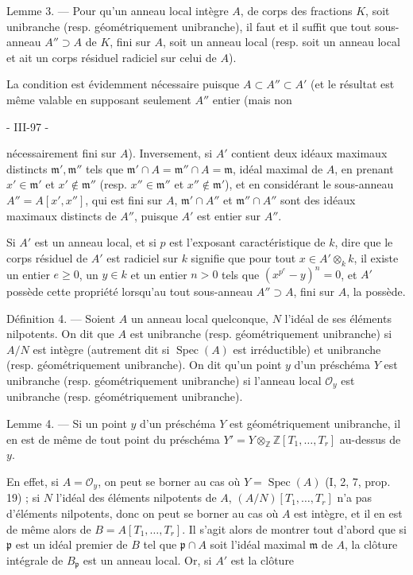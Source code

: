 Lemme 3. — Pour qu'un anneau local intègre $A$, de corps des fractions $K$, soit unibranche (resp. géométriquement unibranche), il faut et il suffit que tout sous-anneau $A'' \supset A$ de $K$, fini sur $A$, soit un anneau local (resp. soit un anneau local et ait un corps résiduel radiciel sur celui de $A$).

La condition est évidemment nécessaire puisque $A \subset A'' \subset A'$ (et le résultat est même valable en supposant seulement $A''$ entier (mais non

\newpage


- III-97 -

nécessairement fini sur $A$). Inversement, si $A'$ contient deux idéaux maximaux distincts $\mathfrak{m}', \mathfrak{m}''$ tels que $\mathfrak{m}' \cap A = \mathfrak{m}'' \cap A = \mathfrak{m}$, idéal maximal de $A$, en prenant $x' \in \mathfrak{m}'$ et $x' \notin \mathfrak{m}''$ (resp. $x'' \in \mathfrak{m}''$ et $x'' \notin \mathfrak{m}'$), et en considérant le sous-anneau $A'' = A[x', x'']$, qui est fini sur $A$, $\mathfrak{m}' \cap A''$ et $\mathfrak{m}'' \cap A''$ sont des idéaux maximaux distincts de $A''$, puisque $A'$ est entier sur $A''$.

Si $A'$ est un anneau local, et si $p$ est l'exposant caractéristique de $k$, dire que le corps résiduel de $A'$ est radiciel sur $k$ signifie que pour tout $x \in A' \otimes_k k$, il existe un entier $e \geq 0$, un $y \in k$ et un entier $n > 0$ tels que $(x^{p^e} - y)^n = 0$, et $A'$ possède cette propriété lorsqu'au tout sous-anneau $A'' \supset A$, fini sur $A$, la possède.

Définition 4. — Soient $A$ un anneau local quelconque, $N$ l'idéal de ses éléments nilpotents. On dit que $A$ est unibranche (resp. géométriquement unibranche) si $A/N$ est intègre (autrement dit si $\operatorname{Spec}(A)$ est irréductible) et unibranche (resp. géométriquement unibranche). On dit qu'un point $y$ d'un préschéma $Y$ est unibranche (resp. géométriquement unibranche) si l'anneau local $\mathcal{O}_y$ est unibranche (resp. géométriquement unibranche).

Lemme 4. — Si un point $y$ d'un préschéma $Y$ est géométriquement unibranche, il en est de même de tout point du préschéma $Y' = Y \otimes_{\mathbb{Z}} \mathbb{Z}[T_1, \dots, T_r]$ au-dessus de $y$.

En effet, si $A = \mathcal{O}_y$, on peut se borner au cas où $Y = \operatorname{Spec}(A)$ (I, 2, 7, prop. 19) ; si $N$ l'idéal des éléments nilpotents de $A$, $(A/N)[T_1, \dots, T_r]$ n'a pas d'éléments nilpotents, donc on peut se borner au cas où $A$ est intègre, et il en est de même alors de $B = A[T_1, \dots, T_r]$. Il s'agit alors de montrer tout d'abord que si $\mathfrak{p}$ est un idéal premier de $B$ tel que $\mathfrak{p} \cap A$ soit l'idéal maximal $\mathfrak{m}$ de $A$, la clôture intégrale de $B_{\mathfrak{p}}$ est un anneau local. Or, si $A'$ est la clôture

